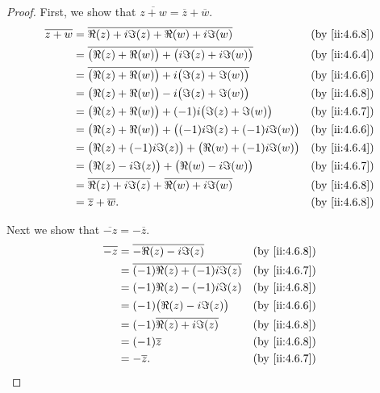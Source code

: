 \begin{proof}
  First, we show that \(\overline{z + w} = \overline{z} + \overline{w}\).
  \begin{align*}
    \overline{z + w} & = \overline{\Re(z) + i \Im(z) + \Re(w) + i \Im(w)}                     &  & \by{ii:4.6.8} \\
                     & = \overline{\big(\Re(z) + \Re(w)\big) + \big(i \Im(z) + i \Im(w)\big)} &  & \by{ii:4.6.4} \\
                     & = \overline{\big(\Re(z) + \Re(w)\big) + i \big(\Im(z) + \Im(w)\big)}   &  & \by{ii:4.6.6} \\
                     & = \big(\Re(z) + \Re(w)\big) - i \big(\Im(z) + \Im(w)\big)              &  & \by{ii:4.6.8} \\
                     & = \big(\Re(z) + \Re(w)\big) + (-1) i \big(\Im(z) + \Im(w)\big)         &  & \by{ii:4.6.7} \\
                     & = \big(\Re(z) + \Re(w)\big) + \big((-1) i \Im(z) + (-1) i \Im(w)\big)  &  & \by{ii:4.6.6} \\
                     & = \big(\Re(z) + (-1) i \Im(z)\big) + \big(\Re(w) + (-1) i \Im(w)\big)  &  & \by{ii:4.6.4} \\
                     & = \big(\Re(z) - i \Im(z)\big) + \big(\Re(w) - i \Im(w)\big)            &  & \by{ii:4.6.7} \\
                     & = \overline{\Re(z) + i \Im(z)} + \overline{\Re(w) + i \Im(w)}          &  & \by{ii:4.6.8} \\
                     & = \overline{z} + \overline{w}.                                         &  & \by{ii:4.6.8}
  \end{align*}

  Next we show that \(\overline{-z} = -\overline{z}\).
  \begin{align*}
    \overline{-z} & = \overline{-\Re(z) - i \Im(z)}          &  & \by{ii:4.6.8} \\
                  & = \overline{(-1) \Re(z) + (-1) i \Im(z)} &  & \by{ii:4.6.7} \\
                  & = (-1) \Re(z) - (-1) i \Im(z)            &  & \by{ii:4.6.8} \\
                  & = (-1) \big(\Re(z) - i \Im(z)\big)       &  & \by{ii:4.6.6} \\
                  & = (-1) \overline{\Re(z) + i \Im(z)}      &  & \by{ii:4.6.8} \\
                  & = (-1) \overline{z}                      &  & \by{ii:4.6.8} \\
                  & = -\overline{z}.                         &  & \by{ii:4.6.7}
  \end{align*}


\end{proof}
